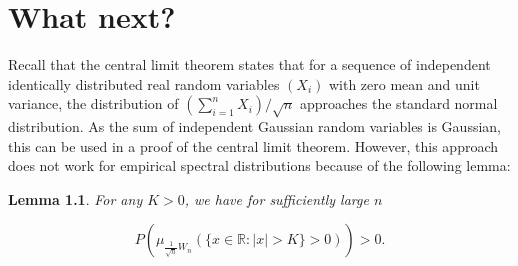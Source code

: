 \documentclass[12pt,a4paper,leqno]{report}
\newcommand{\R}{\mathbb{R}}
\theoremstyle{plain}
\newtheorem{lem}[equation]{Lemma}
\theoremstyle{definition}
\theoremstyle{remark}
\begin{document}
\chapter{What next?}
\label{future}

Recall that the central limit theorem states that for a sequence of independent identically distributed real random variables $(X_i)$ with zero mean and unit variance, the distribution of $(\sum_{i=1}^{n}X_i)/\sqrt{n}$ approaches the standard normal distribution. As the sum of independent Gaussian random variables is Gaussian, this can be used in a proof of the central limit theorem. However, this approach does not work for empirical spectral distributions because of the following lemma:

\begin{lem}
For any $K>0$, we have for sufficiently large $n$

\begin{equation*}
P(\mu_{\frac{1}{\sqrt{n}}W_n} (\{x \in \R : |x|>K\} > 0)) > 0.
\end{equation*}

\end{lem}
\end{document}
